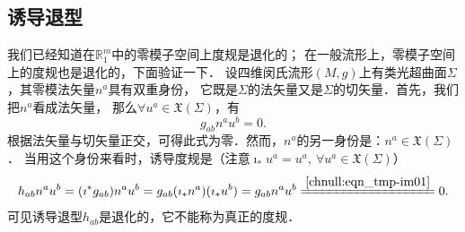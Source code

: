\subsection{诱导退型}
我们已经知道在$\mathbb{R}^m_1$中的零模子空间上度规是退化的；
在一般流形上，零模子空间上的度规也是退化的，下面验证一下．
设四维闵氏流形$(M,g)$上有类光超曲面$\Sigma$，其零模法矢量$n^a$具有双重身份，
它既是$\Sigma$的法矢量又是$\Sigma$的切矢量．首先，我们把$n^a$看成法矢量，
那么$\forall u^a \in \mathfrak{X}(\Sigma)$，有
\begin{equation}\label{chnull:eqn_tmp-im01}
    g_{ab} n^a u^b = 0.
\end{equation}
根据法矢量与切矢量正交，可得此式为零．然而，$n^a$的另一身份是：$n^a \in \mathfrak{X}(\Sigma)$．
当用这个身份来看时，诱导度规是（注意$\imath_* u^a = u^a, \  \forall u^a \in \mathfrak{X}(\Sigma)$）
\begin{equation}
    h_{ab} n^a u^b = (\imath^*g_{ab}) n^a u^b = g_{ab} (\imath_* n^a) (\imath_*u^b)
    =g_{ab} n^a u^b \xlongequal{\ref{chnull:eqn_tmp-im01}} 0.
\end{equation}
可见诱导退型$h_{ab}$是退化的，它不能称为真正的度规．

